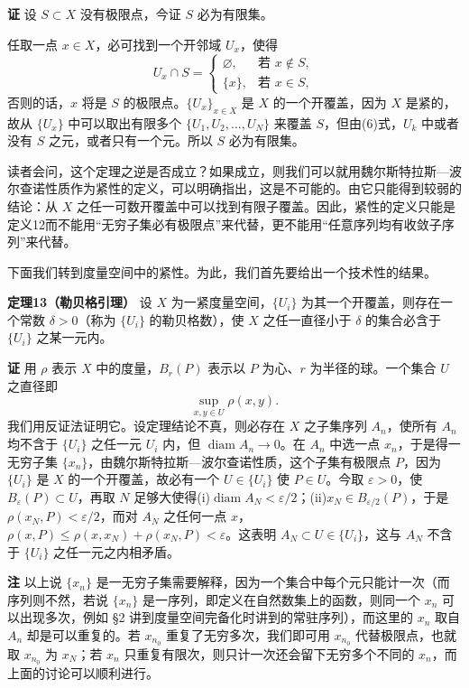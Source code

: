 \noindent\textbf{证}\quad
设 $S\subset X$ 没有极限点，今证 $S$ 必为有限集。

任取一点 $x\in X$，必可找到一个开邻域 $U_x$，使得
\begin{equation}
 U_x\cap S=
 \begin{cases}
 \varnothing, & \text{若 }x\notin S,\\
 \{x\}, & \text{若 }x\in S,
 \end{cases}
 \tag{6}
\end{equation}
否则的话，$x$ 将是 $S$ 的极限点。$\{U_x\}_{x\in X}$ 是 $X$ 的一个开覆盖，因为 $X$ 是紧的，故从 $\{U_x\}$ 中可以取出有限多个 $\{U_1,U_2,\ldots,U_N\}$ 来覆盖 $S$，但由(6)式，$U_k$ 中或者没有 $S$ 之元，或者只有一个元。所以 $S$ 必为有限集。

读者会问，这个定理之逆是否成立？如果成立，则我们可以就用魏尔斯特拉斯—波尔查诺性质作为紧性的定义，可以明确指出，这是不可能的。由它只能得到较弱的结论：从 $X$ 之任一可数开覆盖中可以找到有限子覆盖。因此，紧性的定义只能是定义12而不能用“无穷子集必有极限点”来代替，更不能用“任意序列均有收敛子序列”来代替。

下面我们转到度量空间中的紧性。为此，我们首先要给出一个技术性的结果。

\noindent\textbf{定理13（勒贝格引理）}\quad
设 $X$ 为一紧度量空间，$\{U_i\}$ 为其一个开覆盖，则存在一个常数 $\delta>0$（称为 $\{U_i\}$ 的勒贝格数），使 $X$ 之任一直径小于 $\delta$ 的集合必含于 $\{U_i\}$ 之某一元内。

\noindent\textbf{证}\quad
用 $\rho$ 表示 $X$ 中的度量，$B_r(P)$ 表示以 $P$ 为心、$r$ 为半径的球。一个集合 $U$ 之直径即
\[
 \sup_{x,y\in U}\rho(x,y).
\]
我们用反证法证明它。设定理结论不真，则必存在 $X$ 之子集序列 $A_n$，使所有 $A_n$ 均不含于 $\{U_i\}$ 之任一元 $U_i$ 内，但 $\operatorname{diam}A_n\to0$。在 $A_n$ 中选一点 $x_n$，于是得一无穷子集 $\{x_n\}$，由魏尔斯特拉斯—波尔查诺性质，这个子集有极限点 $P$，因为 $\{U_i\}$ 是 $X$ 的一个开覆盖，故必有一个 $U\in\{U_i\}$ 使 $P\in U$。今取 $\varepsilon>0$，使 $B_\varepsilon(P)\subset U$，再取 $N$ 足够大使得(i)$\operatorname{diam}A_N<\varepsilon/2$；(ii)$x_N\in B_{\varepsilon/2}(P)$，于是 $\rho(x_N,P)<\varepsilon/2$，而对 $A_N$ 之任何一点 $x$，$\rho(x,P)\le\rho(x,x_N)+\rho(x_N,P)<\varepsilon$。这表明 $A_N\subset U\in\{U_i\}$，这与 $A_N$ 不含于 $\{U_i\}$ 之任一元之内相矛盾。

\noindent\textbf{注}\quad
以上说 $\{x_n\}$ 是一无穷子集需要解释，因为一个集合中每个元只能计一次（而序列则不然，若说 $\{x_n\}$ 是一序列，即定义在自然数集上的函数，则同一个 $x_n$ 可以出现多次，例如 §2 讲到度量空间完备化时讲到的常驻序列），而这里的 $x_n$ 取自 $A_n$ 却是可以重复的。若 $x_{n_0}$ 重复了无穷多次，我们即可用 $x_{n_0}$ 代替极限点，也就取 $x_{n_0}$ 为 $x_N$；若 $x_n$ 只重复有限次，则只计一次还会留下无穷多个不同的 $x_n$，而上面的讨论可以顺利进行。

